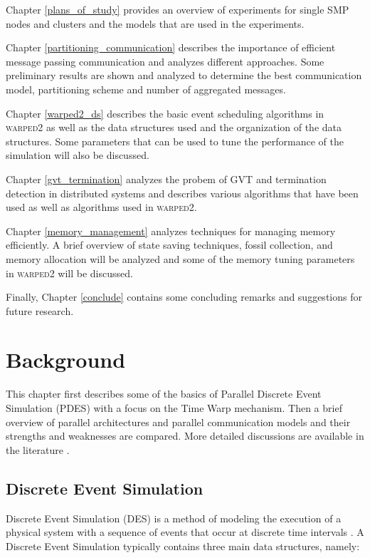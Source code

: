 \documentclass[11pt]{book}
\begin{document}
Chapter \ref{plans_of_study} provides an overview of experiments for single SMP nodes and
clusters and the models that are used in the experiments.

Chapter \ref{partitioning_communication} describes the importance of efficient message
passing communication and analyzes different approaches.  Some preliminary results are
shown and analyzed to determine the best communication model, partitioning scheme and
number of aggregated messages.

Chapter \ref{warped2_ds} describes the basic event scheduling algorithms in
\textsc{warped2} as well as the data structures used and the organization of the data
structures.  Some parameters that can be used to tune the performance of the simulation
will also be discussed.

Chapter \ref{gvt_termination} analyzes the probem of GVT and termination detection in
distributed systems and describes various algorithms that have been used as well as
algorithms used in \textsc{warped2}.

Chapter \ref{memory_management} analyzes techniques for managing memory efficiently.  A
brief overview of state saving techniques, fossil collection, and memory allocation will
be analyzed and some of the memory tuning parameters in \textsc{warped2} will be
discussed.

Finally, Chapter \ref{conclude} contains some concluding remarks and suggestions for
future research.


\chapter{Background}\label{background}

This chapter first describes some of the basics of Parallel Discrete Event Simulation (PDES)
with a focus on the Time Warp mechanism.  Then a brief overview of parallel architectures and
parallel communication models and their strengths and weaknesses are compared.  More
detailed discussions are available in the literature \cite{fujimoto-90,fujimoto-00}.

\section{Discrete Event Simulation}

Discrete Event Simulation (DES) is a method of modeling the execution of a physical system
with a sequence of events that occur at discrete time intervals \cite{law-00}.  A Discrete
Event Simulation typically contains three main data structures, namely:
\end{document}
